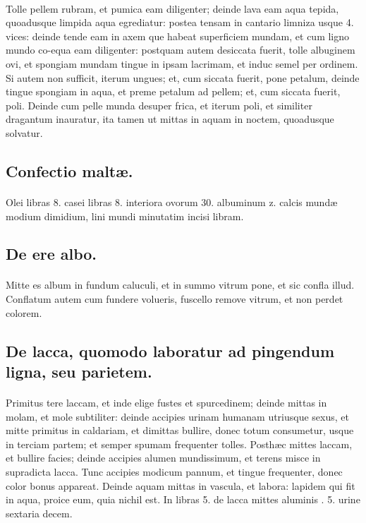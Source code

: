 \documentclass[a4paper, 11pt, oneside, polutonikogreek, italian]{article}
\begin{document}
\paragraph{}
Tolle pellem rubram, et pumica eam diligenter; deinde lava eam aqua tepida, quoadusque limpida aqua egrediatur: postea tensam in cantario limniza usque 4. vices: deinde tende eam in axem que habeat superficiem mundam, et cum ligno mundo co-equa eam diligenter: postquam autem desiccata fuerit, tolle albuginem ovi, et spongiam mundam tingue in ipsam lacrimam, et induc semel per ordinem. Si autem non sufficit, iterum ungues; et, cum siccata fuerit, pone petalum, deinde tingue spongiam in aqua, et preme petalum ad pellem; et, cum siccata fuerit, poli. Deinde cum pelle munda desuper frica, et iterum poli, et similiter dragantum inauratur, ita tamen ut mittas in aquam in noctem, quoadusque solvatur.

\subsection{Confectio maltæ.}
\paragraph{}
Olei libras 8. casei libras 8. interiora ovorum 30. albuminum z. calcis mundæ modium dimidium, lini mundi minutatim incisi libram.

\subsection{De ere albo.}
\paragraph{}
Mitte es album in fundum caluculi, et in summo vitrum pone, et sic confla illud. Conflatum autem cum fundere volueris, fuscello remove vitrum, et non perdet colorem.

\subsection{De lacca, quomodo laboratur ad pingendum ligna, seu parietem.}
\paragraph{}
Primitus tere laccam, et inde elige fustes et spurcedinem; deinde mittas in molam, et mole subtiliter: deinde accipies urinam humanam utriusque sexus, et mitte primitus in caldariam, et dimittas bullire, donec totum consumetur, usque in terciam partem; et semper spumam frequenter tolles. Posthæc mittes laccam, et bullire facies; deinde accipies alumen mundissimum, et terens misce in supradicta lacca. Tunc accipies modicum pannum, et tingue frequenter, donec color bonus appareat. Deinde aquam mittas in vascula, et labora: lapidem qui fit in aqua, proice eum, quia nichil est. In libras 5. de lacca mittes aluminis \roundz. 5. urine sextaria decem.
\end{document}
